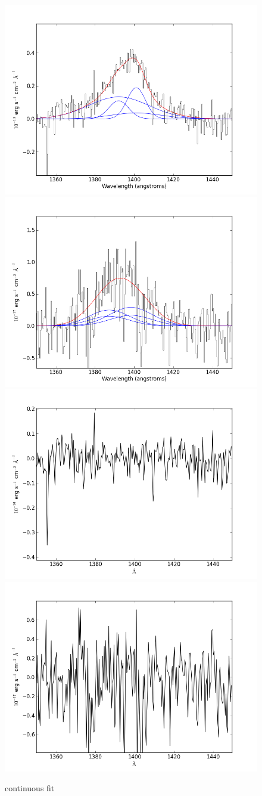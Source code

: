 \documentclass[usenatbib]{mn2e}
\begin{document}
\newpage


\begin{figure}
\begin{center}
\includegraphics[width=0.46\linewidth,angle=0]{SiIV_14.png}
\vspace{5mm}
\includegraphics[width=0.49\linewidth,angle=0]{SiIV_15.png}\\
\includegraphics[width=0.46\linewidth,angle=0]{SiIV_res_14.png}
\hspace{5mm}
\includegraphics[width=0.49\linewidth,angle=0]{SiIV_res_15.png}\\
\end{center} 
\caption{continuous fit \label{fig:landscape}}   
\end{figure}
\end{document}
